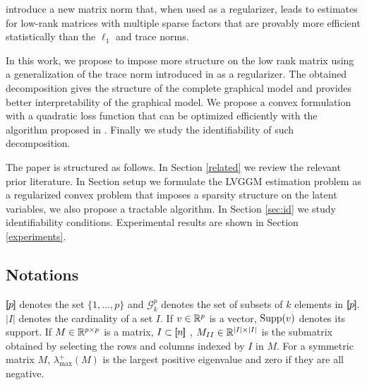 
\citet{richard2014tight} introduce a new matrix norm that, when used as a regularizer, leads to  estimates for low-rank matrices with multiple sparse factors that are provably more efficient statistically than the $\ell_1$ and trace norms.

In this work, we propose to impose more structure on the low rank matrix using a generalization of the trace norm introduced in \citet{richard2014tight} as a regularizer. The obtained decomposition gives the structure of the complete graphical model and provides better interpretability of the graphical model. We propose a convex formulation with a quadratic loss function that can be optimized efficiently with the algorithm proposed in \citet{vinyes2017}.  Finally we study the identifiability of such decomposition. 

The paper is structured as follows. In Section \ref{related} we review the relevant prior literature. In Section {setup} we formulate the LVGGM estimation problem as a regularized convex problem that imposes a sparsity structure on the latent variables, we also propose a tractable algorithm. In Section \ref{sec:id} we study identifiability conditions. Experimental results are shown in Section \ref{experiments}.

\subsection*{Notations}
$[\!\![p]\!\!]$ denotes the set $\{1,...,p\}$ and $\mathcal{G}^p_k$ denotes the
set of subsets of $k$ elements in $[\!\![p]\!\!]$. $|I|$ denotes the cardinality of a set $I$. If $v\in\mathbb{R}^{p}$ is a vector, ${\rm Supp}(v)$ denotes its support. If $M\in\mathbb{R}^{p\times p}$ is a matrix, $I\subset[\!\![n]\!\!]$ , $M_{II}\in\mathbb{R}^{|I|\times |I|}$ is the submatrix obtained by selecting the rows and columns indexed by $I$ in $M$. For a symmetric matrix $M$, $\lambda_{\max}^+(M)$ is the largest positive eigenvalue and zero if they are all negative.

